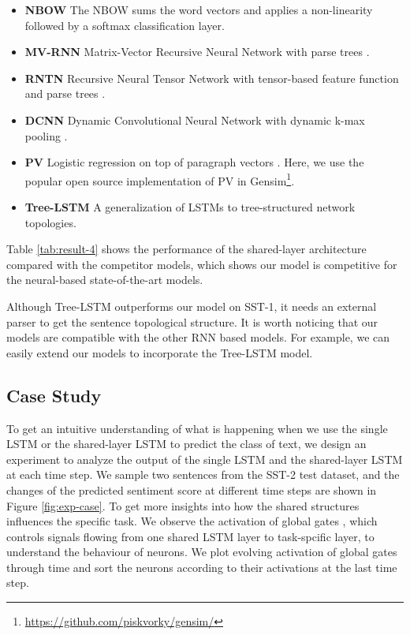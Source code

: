 \documentclass{article}
\begin{document}
\begin{itemize}
\item \textbf{NBOW} The NBOW sums the word vectors and applies a non-linearity followed by a softmax classification layer. \item  \textbf{MV-RNN} Matrix-Vector Recursive Neural Network with parse trees \cite{socher2012semantic}.
\item \textbf{RNTN} Recursive Neural Tensor Network with tensor-based feature function and parse trees \cite{socher2013recursive}.
\item \textbf{DCNN} Dynamic Convolutional Neural Network with dynamic k-max pooling \cite{kalchbrenner2014convolutional}.
\item \textbf{PV} Logistic regression on top of paragraph vectors \cite{le2014distributed}. Here, we use the popular open source implementation of PV in Gensim\footnote{\url{https://github.com/piskvorky/gensim/}}.
\item \textbf{Tree-LSTM} A generalization of LSTMs to tree-structured network topologies. \cite{tai2015improved}
\end{itemize}



Table \ref{tab:result-4} shows the performance of the shared-layer architecture compared with the competitor models, which shows our model is competitive for the neural-based state-of-the-art models.

Although Tree-LSTM outperforms our model on SST-1, it needs an external parser to get the sentence topological structure. It is worth noticing that our models are compatible with the other RNN based models. For example, we can easily extend our models to incorporate the Tree-LSTM model.


\subsection{Case Study}


To get an intuitive understanding of what is happening when we use the single LSTM or the shared-layer LSTM to
predict the class of text, we design an experiment to analyze the output of the single LSTM and the shared-layer LSTM at each time step.
We sample two sentences from the SST-2 test dataset, and the changes of the predicted sentiment score at different time steps are shown in Figure \ref{fig:exp-case}. To get more insights into how the shared structures influences the specific task.
We observe the activation of global gates , which controls signals flowing from one shared LSTM layer to task-spcific layer, to understand the behaviour of neurons.
We plot evolving activation of global gates  through time and sort the neurons according to their activations at the last time step.
\end{document}
